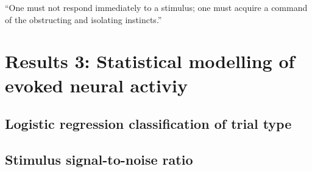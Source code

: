 \begin{savequote}[8cm]

“One must not respond immediately to a stimulus; one must acquire a command of the obstructing and isolating instincts.”
\end{savequote}

\chapter{\label{res3}Results 3: Statistical modelling of evoked neural activiy
}
\section{Logistic regression classification of trial type}
\section{Stimulus signal-to-noise ratio}


